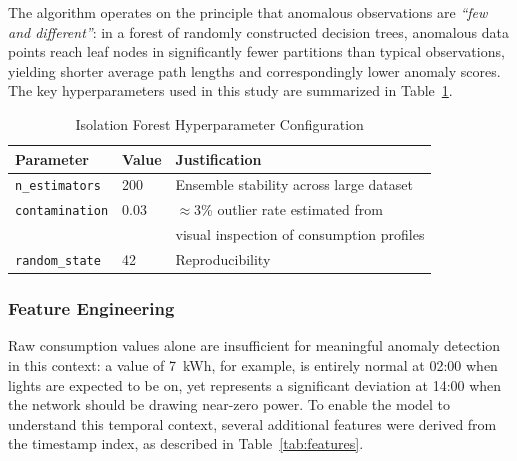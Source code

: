 \documentclass{article}
\begin{document}
The algorithm operates on the principle that anomalous observations are \textit{``few and different''}: in a forest of randomly constructed decision trees, anomalous data points reach leaf nodes in significantly fewer partitions than typical observations, yielding shorter average path lengths and correspondingly lower anomaly scores. The key hyperparameters used in this study are summarized in Table~\ref{tab:if_params}.

\begin{table}[h]
\centering
\caption{Isolation Forest Hyperparameter Configuration}
\label{tab:if_params}
\begin{tabular}{lll}
\hline
\textbf{Parameter} & \textbf{Value} & \textbf{Justification} \\
\hline
\texttt{n\_estimators}  & 200  & Ensemble stability across large dataset \\
\texttt{contamination}  & 0.03 & $\approx$3\% outlier rate estimated from \\
                        &      & visual inspection of consumption profiles \\
\texttt{random\_state}  & 42   & Reproducibility \\
\hline
\end{tabular}
\end{table}

\subsubsection{Feature Engineering}

Raw consumption values alone are insufficient for meaningful anomaly detection in this context: a value of 7~kWh, for example, is entirely normal at 02:00 when lights are expected to be on, yet represents a significant deviation at 14:00 when the network should be drawing near-zero power. To enable the model to understand this temporal context, several additional features were derived from the timestamp index, as described in Table~\ref{tab:features}.
\end{document}
